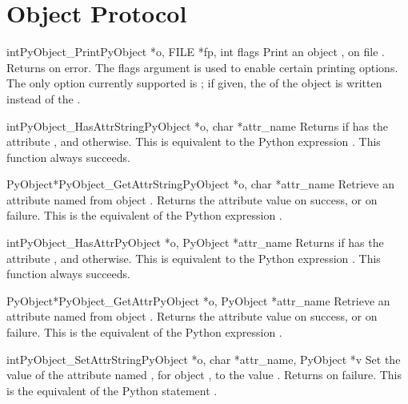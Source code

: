 \documentclass{manual}
\begin{document}
\section{Object Protocol \label{object}}

\begin{cfuncdesc}{int}{PyObject_Print}{PyObject *o, FILE *fp, int flags}
Print an object , on file .  Returns  on error.
The flags argument is used to enable certain printing options.  The
only option currently supported is ; if given,
the  of the object is written instead of the
.
\end{cfuncdesc}

\begin{cfuncdesc}{int}{PyObject_HasAttrString}{PyObject *o, char *attr_name}
Returns  if  has the attribute , and
 otherwise.  This is equivalent to the Python expression
.
This function always succeeds.
\end{cfuncdesc}

\begin{cfuncdesc}{PyObject*}{PyObject_GetAttrString}{PyObject *o,
                                                     char *attr_name}
Retrieve an attribute named  from object .
Returns the attribute value on success, or \NULL{} on failure.
This is the equivalent of the Python expression
.
\end{cfuncdesc}


\begin{cfuncdesc}{int}{PyObject_HasAttr}{PyObject *o, PyObject *attr_name}
Returns  if  has the attribute , and
 otherwise.  This is equivalent to the Python expression
. 
This function always succeeds.
\end{cfuncdesc}


\begin{cfuncdesc}{PyObject*}{PyObject_GetAttr}{PyObject *o,
                                               PyObject *attr_name}
Retrieve an attribute named  from object .
Returns the attribute value on success, or \NULL{} on failure.
This is the equivalent of the Python expression
.
\end{cfuncdesc}


\begin{cfuncdesc}{int}{PyObject_SetAttrString}{PyObject *o, char *attr_name, PyObject *v}
Set the value of the attribute named , for object
, to the value . Returns  on failure.  This is
the equivalent of the Python statement .
\end{cfuncdesc}
\end{document}

